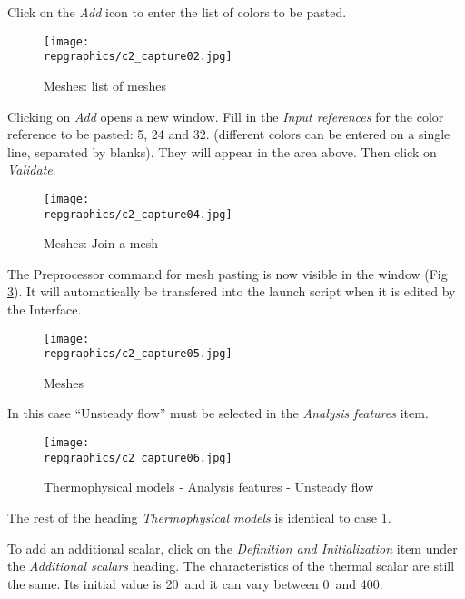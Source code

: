 Click on the {\itshape Add} icon to enter the list of colors to be pasted.

\begin{figure}[h!]
\begin{center}
\texttt{[image: \\repgraphics/c2\_capture02.jpg]}
\caption{Meshes: list of meshes}
\label{fig2_e2}
\end{center}
\end{figure}


\newpage
Clicking on {\itshape Add} opens a new window. Fill in the
{\itshape Input references} for the color reference to be pasted: 5, 24 and 32.
(different colors can be entered on a single line, separated by blanks). They
will appear in the area above. Then click on {\itshape Validate}.


\begin{figure}[h!]
\begin{center}
\texttt{[image: \\repgraphics/c2\_capture04.jpg]}
\caption{Meshes: Join a mesh}
\label{fig4_e2}
\end{center}
\end{figure}


\newpage
The Preprocessor command for mesh pasting is now visible in the window (Fig
\ref{fig5_e2}). It will automatically be transfered into the launch script when
it is edited by the Interface.

\begin{figure}[h!]
\begin{center}
\texttt{[image: \\repgraphics/c2\_capture05.jpg]}
\caption{Meshes}
\label{fig5_e2}
\end{center}
\end{figure}


\newpage
In this case ``Unsteady flow'' must be selected in the
{\itshape Analysis features} item.

\begin{figure}[h!]
\begin{center}
\texttt{[image: \\repgraphics/c2\_capture06.jpg]}
\caption{Thermophysical models - Analysis features - Unsteady flow}
\label{fig6_e2}
\end{center}
\end{figure}

The rest of the heading {\itshape Thermophysical models} is identical to case
1.


\newpage
To add an additional scalar, click on the
{\itshape Definition and Initialization} item under the
{\itshape Additional scalars} heading.
The characteristics of the thermal scalar are still the
same. Its initial value is 20\degresC\ and it can vary between
0\degresC\ and 400\degresC.

